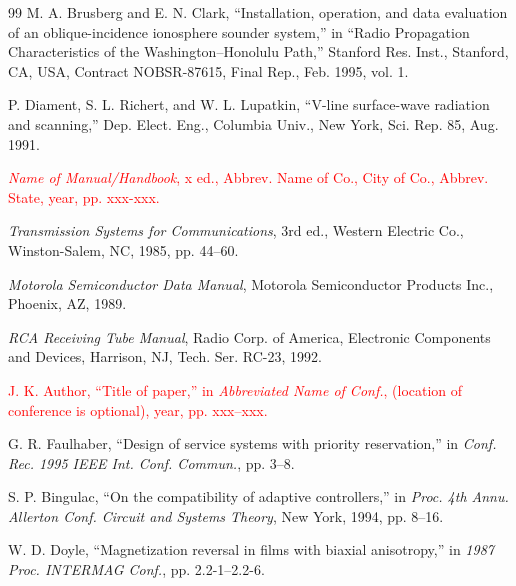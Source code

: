 \documentclass[11pt,a5paper,twoside]{article}
\begin{document}
\begin{thebibliography}{99}
 M. A. Brusberg and E. N. Clark, ``Installation, operation, and data 
evaluation of an oblique-incidence ionosphere sounder system,'' in ``Radio 
Propagation Characteristics of the Washington--Honolulu Path,'' Stanford 
Res. Inst., Stanford, CA, USA, Contract NOBSR-87615, Final Rep., Feb. 1995, 
vol. 1. 

 P. Diament, S. L. Richert, and W. L. Lupatkin, ``V-line surface-wave radiation and scanning,'' Dep. Elect. Eng., Columbia Univ., New York, Sci. Rep. 85, Aug. 1991. 



 \textcolor{red}{
\textit{Name of Manual/Handbook}, x ed., Abbrev. Name of Co., City of Co., Abbrev. State, year, pp. xxx-xxx. 
}

 \textit{Transmission Systems for Communications}, 3rd ed., Western Electric Co., Winston-Salem, NC, 1985, pp. 44--60. 

 \textit{Motorola Semiconductor Data Manual}, Motorola Semiconductor Products Inc., Phoenix, AZ, 1989. 

 \textit{RCA Receiving Tube Manual}, Radio Corp. of America, Electronic Components and Devices, Harrison, 
NJ, Tech. Ser. RC-23, 1992. 



  \textcolor{red}{
J. K. Author, ``Title of paper,'' in \textit{Abbreviated Name of Conf.}, (location of conference is optional), year, pp. xxx--xxx. 
}

  G. R. Faulhaber, ``Design of service systems with priority 
reservation,'' in \textit{Conf. Rec. 1995 IEEE Int. Conf. Commun.}, pp. 3--8. %

  S. P. Bingulac, ``On the compatibility of adaptive controllers,'' in 
\textit{Proc. 4th Annu. Allerton Conf. Circuit and Systems Theory}, New York, 1994, pp. 8--16. 

  W. D. Doyle, ``Magnetization reversal in films with biaxial 
anisotropy,'' in \textit{1987 Proc. INTERMAG Conf.}, pp. 2.2-1--2.2-6. 


\end{thebibliography}
\end{document}
